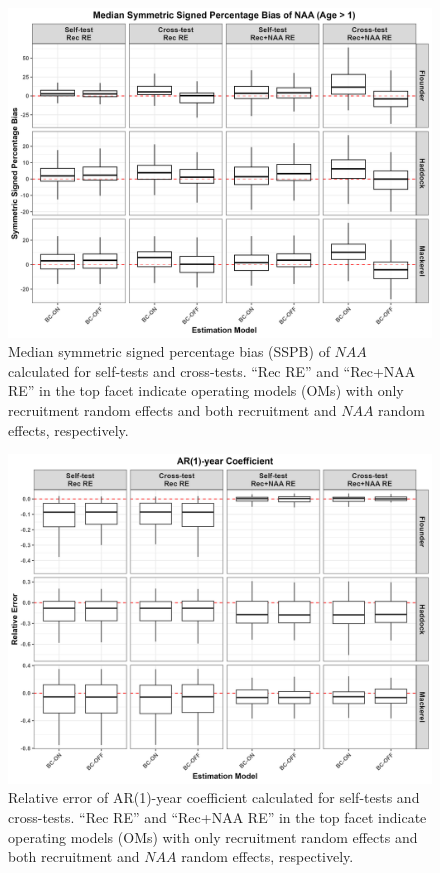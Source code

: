 \documentclass[
  12pt,
]{article}
\begin{document}
\begin{figure}[H]
    \centering
    \includegraphics[width=\textwidth]{Revised_Figures&Tables/Median_NAA_SSPB.PNG}
    \caption{Median symmetric signed percentage bias (SSPB) of $NAA$ calculated for self-tests and cross-tests. ``Rec RE'' and ``Rec+NAA RE'' in the top facet indicate operating models (OMs) with only recruitment random effects and both recruitment and $NAA$ random effects, respectively.}
    \label{fig:supp_NAA_SSPB}
\end{figure}

\begin{figure}[H]
\centering
\includegraphics[width=\textwidth]{Revised_Figures&Tables/Rho.PNG}
\caption{Relative error of AR(1)-year coefficient calculated for self-tests and cross-tests. ``Rec RE'' and ``Rec+NAA RE'' in the top facet indicate operating models (OMs) with only recruitment random effects and both recruitment and $NAA$ random effects, respectively.}
\label{fig:supp_ar1}
\end{figure}
\end{document}
